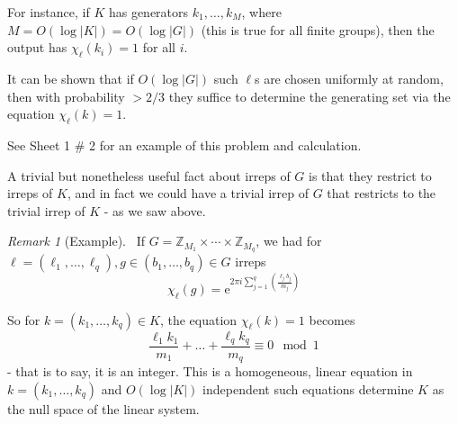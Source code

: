 \documentclass[]{article}
\theoremstyle{custhm}
\theoremstyle{cusdef}
\theoremstyle{custhm}
\theoremstyle{custhm}
\theoremstyle{custhm}
\theoremstyle{custhm}
\theoremstyle{cusdef}
\theoremstyle{remark}
\newtheorem*{remark*}{Remark}
\newcommand{\Z}{\mathbb{Z}}
\newcommand{\e}{\mathrm{e}}
\begin{document}
\begin{itemize}
\begin{itemize}
	For instance, if $K$ has generators $k_1,\dots,k_M$, where $M = O(\log |K|) = O(\log |G|)$ (this is true for all finite groups), then the output has $\chi_{\ell}(k_i) = 1$ for all $i$.
	
	It can be shown that if $O(\log |G|)$ such $\ell$s are chosen uniformly at random, then with probability $> 2/3$ they suffice to determine the generating set via the equation $\chi_{\ell}(k) = 1$.
	
	See Sheet 1 \# 2 for an example of this problem and calculation.
	\end{itemize}
\end{itemize}

A trivial but nonetheless useful fact about irreps of $G$ is that they restrict to irreps of $K$, and in fact we could have a trivial irrep of $G$ that restricts to the trivial irrep of $K$ - as we saw above.

\begin{remark*}[Example]\
If $G = \Z_{M_1}\times\cdots\times \Z_{M_q}$, we had for $\ell = (\ell_1,\dots,\ell_q), g\in (b_1,\dots,b_q)\in G$ irreps $$\chi_{\ell}(g) = \e^{2\pi i\sum_{j=1}^{q}\left(\frac{\ell_j b_j}{m_j}\right)}$$

So for $k = (k_1,\dots,k_q)\in K$, the equation $\chi_{\ell}(k) = 1$ becomes
\[
\frac{\ell_1 k_1}{m_1} +\dots + \frac{\ell_q k_q}{m_q} \equiv 0\mod 1
\]
- that is to say, it is an integer. This is a homogeneous, linear equation in $k = (k_1,\dots,k_q)$ and $O(\log |K|)$ independent such equations determine $K$ as the null space of the linear system.
\end{remark*}
\end{document}
